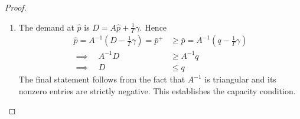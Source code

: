 \documentclass[12pt]{article}
\numberwithin{equation}{subsection}
\theoremstyle{definition}
\begin{document}
\begin{proof}
\begin{enumerate}

\item The demand at $\hat p$ is $D = A \hat p + \frac{1}{\Gamma}\gamma$. Hence
\begin{align*}
\hat p = A^{-1} (D - \frac{1}{\Gamma} \gamma) = \bar p^+ &\geq \bar p = A^{-1} (q - \frac{1}{\Gamma} \gamma) \\
\implies \quad A^{-1} D &\geq A^{-1} q \\
\implies \quad D &\leq q
\end{align*}
The final statement follows from the fact that $A^{-1}$ is triangular and its nonzero entries are strictly negative. This establishes the capacity condition. 


\end{enumerate}
\end{proof}
\end{document}
